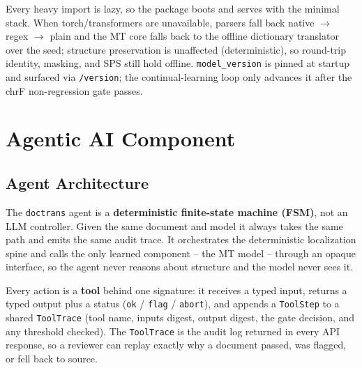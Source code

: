 \documentclass[12pt,a4paper]{article}
\begin{document}
Every heavy import is lazy, so the package boots and serves with the minimal stack. When torch/transformers are unavailable, parsers fall back native $\rightarrow$ regex $\rightarrow$ plain and the MT core falls back to the offline dictionary translator over the seed; structure preservation is unaffected (deterministic), so round-trip identity, masking, and SPS still hold offline. \texttt{model\_version} is pinned at startup and surfaced via \texttt{/version}; the continual-learning loop only advances it after the chrF non-regression gate passes.

\section{Agentic AI Component}

\subsection{Agent Architecture}

The \texttt{doctrans} agent is a \textbf{deterministic finite-state machine (FSM)}, not an LLM controller. Given the same document and model it always takes the same path and emits the same audit trace. It orchestrates the deterministic localization spine and calls the only learned component -- the MT model -- through an opaque interface, so the agent never reasons about structure and the model never sees it.

Every action is a \textbf{tool} behind one signature: it receives a typed input, returns a typed output plus a status (\texttt{ok} / \texttt{flag} / \texttt{abort}), and appends a \texttt{ToolStep} to a shared \texttt{ToolTrace} (tool name, inputs digest, output digest, the gate decision, and any threshold checked). The \texttt{ToolTrace} is the audit log returned in every API response, so a reviewer can replay exactly why a document passed, was flagged, or fell back to source.
\end{document}
